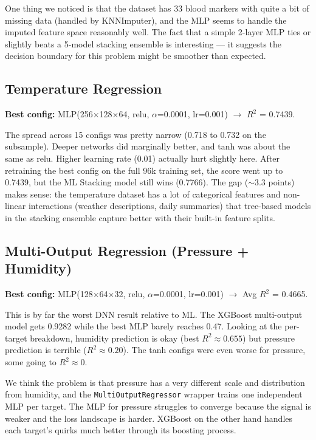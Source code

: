 \documentclass[11pt,a4paper]{article}
\begin{document}
One thing we noticed is that the dataset has 33 blood markers with quite a bit of missing data (handled by KNNImputer), and the MLP seems to handle the imputed feature space reasonably well. The fact that a simple 2-layer MLP ties or slightly beats a 5-model stacking ensemble is interesting --- it suggests the decision boundary for this problem might be smoother than expected.

\subsection{Temperature Regression}

\textbf{Best config:} MLP(256$\times$128$\times$64, relu, $\alpha$=0.0001, lr=0.001) $\rightarrow$ $R^2$ = 0.7439.

The spread across 15 configs was pretty narrow (0.718 to 0.732 on the subsample). Deeper networks did marginally better, and tanh was about the same as relu. Higher learning rate (0.01) actually hurt slightly here.
After retraining the best config on the full 96k training set, the score went up to 0.7439, but the ML Stacking model still wins (0.7766). The gap ($\sim$3.3 points) makes sense: the temperature dataset has a lot of categorical features and non-linear interactions (weather descriptions, daily summaries) that tree-based models in the stacking ensemble capture better with their built-in feature splits.

\subsection{Multi-Output Regression (Pressure + Humidity)}

\textbf{Best config:} MLP(128$\times$64$\times$32, relu, $\alpha$=0.0001, lr=0.001) $\rightarrow$ Avg $R^2$ = 0.4665.

This is by far the worst DNN result relative to ML. The XGBoost multi-output model gets 0.9282 while the best MLP barely reaches 0.47.
Looking at the per-target breakdown, humidity prediction is okay (best $R^2 \approx 0.655$) but pressure prediction is terrible ($R^2 \approx 0.20$). The tanh configs were even worse for pressure, some going to $R^2 \approx 0$.

We think the problem is that pressure has a very different scale and distribution from humidity, and the \texttt{MultiOutputRegressor} wrapper trains one independent MLP per target. The MLP for pressure struggles to converge because the signal is weaker and the loss landscape is harder. XGBoost on the other hand handles each target's quirks much better through its boosting process.
\end{document}
